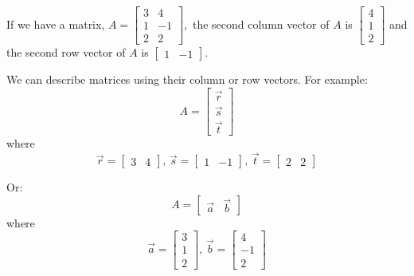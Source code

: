 \documentclass[../main.tex]{subfiles}
\begin{document}
\begin{example}[]
    If we have a matrix, \( A = \begin{bmatrix}
        3 & 4 \\
        1 & -1 \\
        2 & 2 
    \end{bmatrix}, \)
    the second column vector of \( A \) is \( \begin{bmatrix}
        4 \\
        1 \\
        2
    \end{bmatrix} \)
    and the second row vector of \( A \) is \( \begin{bmatrix}
        1 & -1
    \end{bmatrix} \).

    We can describe matrices using their column or row vectors. For example:
    \[ A = \begin{bmatrix}
        \vec{r} \\
        \vec{s} \\
        \vec{t}
    \end{bmatrix} \]
    where \[ \vec{r} = \begin{bmatrix}
        3 & 4
    \end{bmatrix}, \, \vec{s} = \begin{bmatrix}
        1 & -1
    \end{bmatrix}, \, \vec{t} = \begin{bmatrix}
        2 & 2
    \end{bmatrix} \]

    Or: \[ A = \begin{bmatrix}
        \vec{a} & \vec{b}
    \end{bmatrix} \]
    where \[ \vec{a} = \begin{bmatrix}
        3 \\
        1 \\
        2
    \end{bmatrix}, \, \vec{b} = \begin{bmatrix}
        4 \\
        -1 \\
        2
    \end{bmatrix} \]
\end{example}
\end{document}
